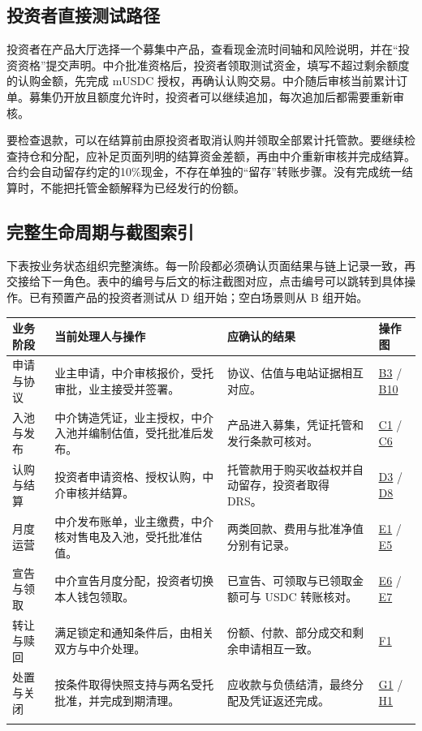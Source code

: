 \documentclass[12pt,a4paper]{article}
\begin{document}
\subsection{投资者直接测试路径}
投资者在产品大厅选择一个募集中产品，查看现金流时间轴和风险说明，并在“投资资格”提交声明。中介批准资格后，投资者领取测试资金，填写不超过剩余额度的认购金额，先完成 mUSDC 授权，再确认认购交易。中介随后审核当前累计订单。募集仍开放且额度允许时，投资者可以继续追加，每次追加后都需要重新审核。

要检查退款，可以在结算前由原投资者取消认购并领取全部累计托管款。要继续检查持仓和分配，应补足页面列明的结算资金差额，再由中介重新审核并完成结算。合约会自动留存约定的10\%现金，不存在单独的“留存”转账步骤。没有完成统一结算时，不能把托管金额解释为已经发行的份额。

\clearpage
\subsection{完整生命周期与截图索引}
下表按业务状态组织完整演练。每一阶段都必须确认页面结果与链上记录一致，再交接给下一角色。表中的编号与后文的标注截图对应，点击编号可以跳转到具体操作。已有预置产品的投资者测试从 D 组开始；空白场景则从 B 组开始。

\begin{longtable}{L{2.8cm}L{4.6cm}L{5.1cm}L{1.7cm}}\toprule 业务阶段 & 当前处理人与操作 & 应确认的结果 & 操作图\\\midrule\endhead
申请与协议 & 业主申请，中介审核报价，受托审批，业主接受并签署。 & 协议、估值与电站证据相互对应。 & \hyperref[step:B3]{B3} / \hyperref[step:B10]{B10}\\\addlinespace
入池与发布 & 中介铸造凭证，业主授权，中介入池并编制估值，受托批准后发布。 & 产品进入募集，凭证托管和发行条款可核对。 & \hyperref[step:C1]{C1} / \hyperref[step:C6]{C6}\\\addlinespace
认购与结算 & 投资者申请资格、授权认购，中介审核并结算。 & 托管款用于购买收益权并自动留存，投资者取得 DRS。 & \hyperref[step:D3]{D3} / \hyperref[step:D8]{D8}\\\addlinespace
月度运营 & 中介发布账单，业主缴费，中介核对售电及入池，受托批准估值。 & 两类回款、费用与批准净值分别有记录。 & \hyperref[step:E1]{E1} / \hyperref[step:E5]{E5}\\\addlinespace
宣告与领取 & 中介宣告月度分配，投资者切换本人钱包领取。 & 已宣告、可领取与已领取金额可与 USDC 转账核对。 & \hyperref[step:E6]{E6} / \hyperref[step:E7]{E7}\\\addlinespace
转让与赎回 & 满足锁定和通知条件后，由相关双方与中介处理。 & 份额、付款、部分成交和剩余申请相互一致。 & \hyperref[step:F1]{F1}\\\addlinespace
处置与关闭 & 按条件取得快照支持与两名受托批准，并完成到期清理。 & 应收款与负债结清，最终分配及凭证返还完成。 & \hyperref[step:G1]{G1} / \hyperref[step:H1]{H1}\\\addlinespace
\bottomrule\end{longtable}
\end{document}
